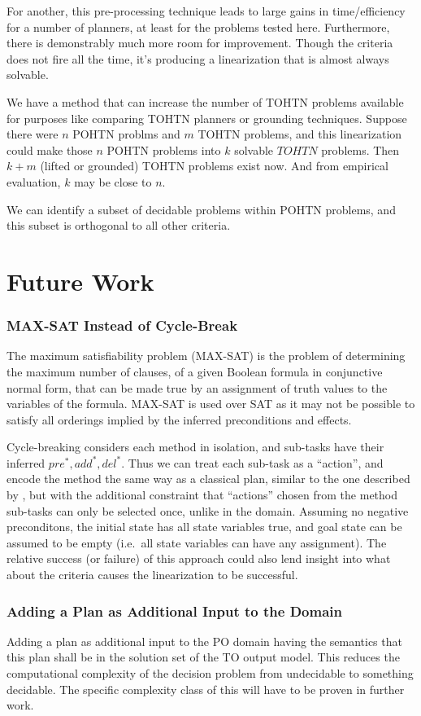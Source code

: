 \documentclass[letterpaper]{article}
\newcommand{\PreS} {\ensuremath{\mathit{pre^{*}}}}
\newcommand{\AddS} {\ensuremath{\mathit{add^{*}}}}
\newcommand{\DelS} {\ensuremath{\mathit{del^{*}}}}
\begin{document}
For another, this pre-processing technique leads to large gains in time/efficiency for a number of planners, at least for the problems tested here. Furthermore, there is demonstrably much more room for improvement. Though the criteria does not fire all the time, it's producing a linearization that is almost always solvable.

We have a method that can increase the number of TOHTN problems available for purposes like comparing TOHTN planners or grounding techniques. Suppose there were $n$ POHTN problms and $m$ TOHTN problems, and this linearization could make those $n$ POHTN problems into $k$ solvable $TOHTN$ problems. Then $k+m$ (lifted or grounded) TOHTN problems exist now. And from empirical evaluation, $k$ may be close to $n$.

We can identify a subset of decidable problems within POHTN problems, and this subset is orthogonal to all other criteria.


\section{Future Work}


\subsubsection{MAX-SAT Instead of Cycle-Break} 
The maximum satisfiability problem (MAX-SAT) is the problem of determining the maximum number of clauses, of a given Boolean formula in conjunctive normal form, that can be made true by an assignment of truth values to the variables of the formula. MAX-SAT is used over SAT as it may not be possible to satisfy all orderings implied by the inferred preconditions and effects.

Cycle-breaking considers each method in isolation, and sub-tasks have their inferred $\PreS, \AddS, \DelS$. Thus we can treat each sub-task as a \enquote{action}, and encode the method the same way as a classical plan, similar to the one described by \cite{RINTANEN201245}, but with the additional constraint that \enquote{actions} chosen from the method sub-tasks can only be selected once, unlike in the domain. Assuming no negative preconditons, the initial state has all state variables true, and goal state can be assumed to be empty (i.e.\ all state variables can have any assignment). The relative success (or failure) of this approach could also lend insight into what about the criteria causes the linearization to be successful.
  

\subsubsection{Adding a Plan as Additional Input to the Domain}
Adding a plan as additional input to the PO domain having the
semantics that this plan shall be in the solution set of the TO output
model. This reduces the computational complexity of the decision problem from undecidable to something decidable. The specific complexity class of this will have to be proven in further work.  %



\end{document}
